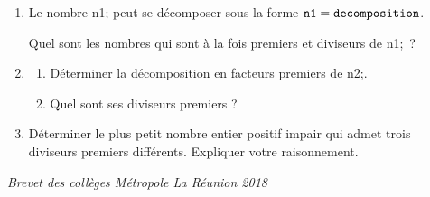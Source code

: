 \documentclass[exercice]{thedocument}%
\begin{document}
%
\begin{enumerate}
    \item Le nombre \<n1; peut se décomposer sous la forme
    $\<n1;=\<decomposition;$.\par\noindent
    Quel sont les nombres qui sont à la fois premiers et diviseurs de \<n1;~?
    \item\begin{enumerate}
        \item Déterminer la décomposition en facteurs premiers de \<n2;.
        \item Quel sont ses diviseurs premiers ?
    \end{enumerate}
    \item Déterminer le plus petit nombre entier positif impair qui admet
    trois diviseurs premiers différents. Expliquer votre raisonnement.
\end{enumerate}\vskip10pt\hfill{\itshape Brevet des collèges Métropole La Réunion 2018}
\end{document}
